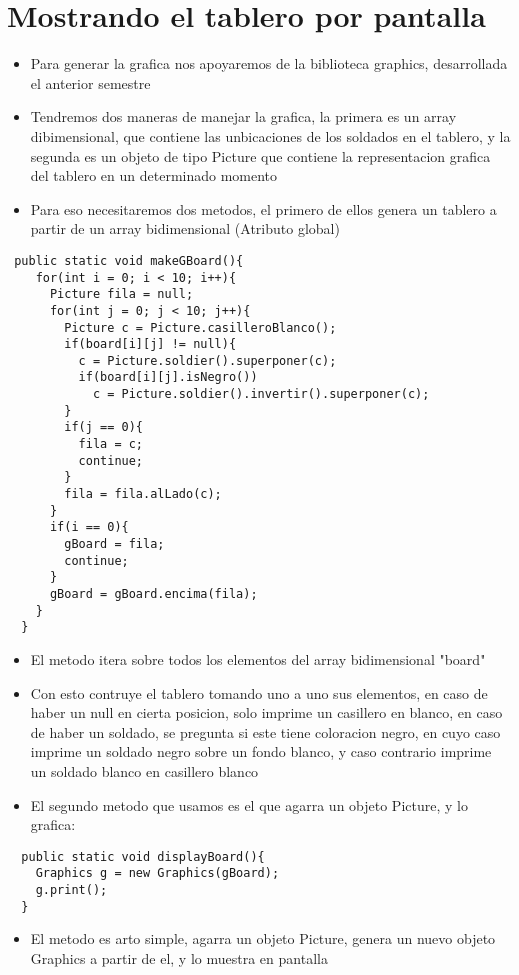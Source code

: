 \section{Mostrando el tablero por pantalla}
\begin{itemize}
  \item Para generar la grafica nos apoyaremos de la biblioteca graphics, desarrollada el anterior semestre
  \item Tendremos dos maneras de manejar la grafica, la primera es un array dibimensional, que contiene las unbicaciones de los soldados en el tablero, y la segunda es un objeto de tipo Picture que contiene la representacion grafica del tablero en un determinado momento
  \item Para eso necesitaremos dos metodos, el primero de ellos genera un tablero a partir de un array bidimensional (Atributo global)
\end{itemize}
\begin{lstlisting}
 public static void makeGBoard(){
    for(int i = 0; i < 10; i++){
      Picture fila = null;
      for(int j = 0; j < 10; j++){
        Picture c = Picture.casilleroBlanco();
        if(board[i][j] != null){
          c = Picture.soldier().superponer(c);
          if(board[i][j].isNegro())
            c = Picture.soldier().invertir().superponer(c);
        }
        if(j == 0){
          fila = c;
          continue;
        }
        fila = fila.alLado(c);
      }
      if(i == 0){
        gBoard = fila;
        continue;
      }
      gBoard = gBoard.encima(fila);
    } 
  }
\end{lstlisting}
\begin{itemize}
  \item El metodo itera sobre todos los elementos del array bidimensional "board"
  \item Con esto contruye el tablero tomando uno a uno sus elementos, en caso de haber un null en cierta posicion, solo imprime un casillero en blanco, en caso de haber un soldado, se pregunta si este tiene coloracion negro, en cuyo caso imprime un soldado negro sobre un fondo blanco, y caso contrario imprime un soldado blanco en casillero blanco
  \item El segundo metodo que usamos es el que agarra un objeto Picture, y lo grafica:
\end{itemize}
\begin{lstlisting}
  public static void displayBoard(){
    Graphics g = new Graphics(gBoard);
    g.print();
  }
\end{lstlisting}
\begin{itemize}
  \item El metodo es arto simple, agarra un objeto Picture, genera un nuevo objeto Graphics a partir de el, y lo muestra en pantalla
\end{itemize}
